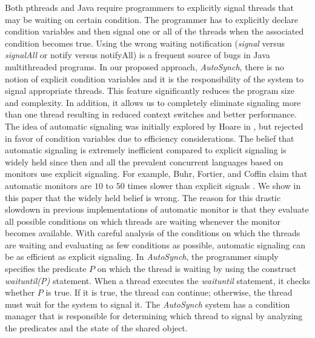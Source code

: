 \documentclass{sigplanconf}
\begin{document}
Both pthreads and Java require programmers to explicitly
signal threads that may be waiting on certain condition. The programmer
has to explicitly declare condition variables and then signal one
or all of the threads when the associated condition becomes true.
Using the wrong waiting notification ({\em signal} versus {\em signalAll} or notify
versus notifyAll) is a frequent source of bugs in Java multithreaded
programs. In our proposed approach, {\em AutoSynch}, there is no notion of
explicit condition variables
and it is the responsibility of the system to signal appropriate threads.
This feature significantly reduces the program size and complexity.
In addition, it allows us to completely eliminate signaling more than 
one thread resulting in reduced context switches and better performance.
The idea of automatic signaling was initially explored by Hoare in \cite{hoa74},
but rejected in favor of condition variables due to efficiency considerations.
The belief that automatic signaling is extremely inefficient compared to
explicit signaling is widely held since then and
all the prevalent concurrent languages based on monitors use
explicit signaling.
For example, Buhr, Fortier, and Coffin claim that automatic monitors are $10$ to $50$ times
slower than explicit signals \cite{bfc95}. We show in this
paper that the widely held belief is wrong.
The reason for this drastic slowdown in 
previous implementations of automatic monitor  is that they evaluate
all possible conditions on which threads are waiting whenever the monitor
becomes available. 
 With careful analysis of the conditions on which
the threads are waiting and evaluating as few conditions as possible, automatic signaling can be as efficient 
as explicit signaling.
In {\em AutoSynch}, the programmer simply specifies the predicate $P$ on which 
the thread is waiting by using the construct {\em waituntil(P)} statement. 
When a thread executes the {\em waituntil} statement, it checks whether $P$ is true. If it is true, the thread can continue; 
otherwise, the thread must wait for the system to signal it. The {\em
AutoSynch} system has a condition manager that is responsible for determining
which thread to signal by analyzing the predicates and the state of the shared object. 
\end{document}
